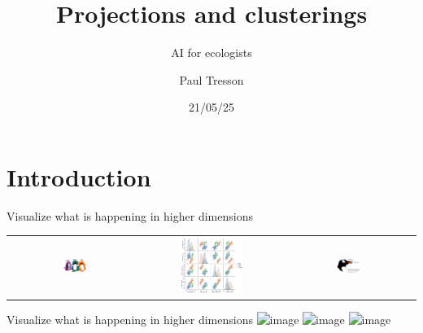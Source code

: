 \documentclass{irdbeamer}
\title{Projections and clusterings}
\subtitle{AI for ecologists}
\author[Paul Tresson]{Paul Tresson}
\date{21/05/25} %
\begin{document}
\maketitle

\usebackgroundtemplate{}

\section{Introduction}

\begin{frame}{Visualize what is happening in higher dimensions}
    \centering
    \begin{tabular}{ccc}
        \includegraphics[width=0.2\textwidth]{./figs/lter_penguins.png}&
        \includegraphics[width=0.5\textwidth]{./figs/penguins.png}&
        \includegraphics[width=0.2\textwidth]{./figs/culmen_depth.png}\\
    \end{tabular}
\end{frame}

\begin{frame}{Visualize what is happening in higher dimensions}
    \centering
        \includegraphics<1>[width=0.5\textwidth]{./figs/mnist.png}%
        \includegraphics<2>[width=0.5\textwidth]{./figs/mnist_pairplot.png}%
        \includegraphics<3>[width=0.5\textwidth]{./figs/mnist_umap.png}%
\end{frame}
\end{document}
